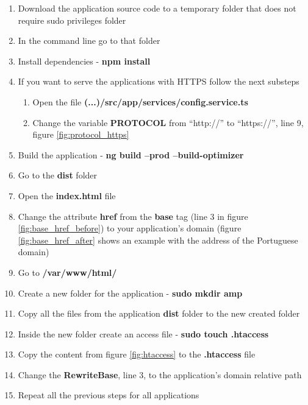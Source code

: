\begin{enumerate}
    \item Download the application source code to a temporary folder that does not require sudo privileges folder \item In the command line go to that folder
    \item Install dependencies - \textbf{npm install}
    \item If you want to serve the applications with HTTPS follow the next substeps
    \begin{enumerate}
        \item Open the file \textbf{(...)/src/app/services/config.service.ts}
        \item Change the variable \textbf{PROTOCOL} from ``http://'' to ``https://'', line 9, figure \ref{fig:protocol_https}
    \end{enumerate}
    \item Build the application - \textbf{ng build --prod --build-optimizer}
    \item Go to the \textbf{dist} folder
    \item Open the \textbf{index.html} file
    \item Change the attribute \textbf{href} from the \textbf{base} tag (line 3 in figure \ref{fig:base_href_before}) to your application's domain (figure \ref{fig:base_href_after} shows an example with the address of the Portuguese domain)
    \item Go to \textbf{/var/www/html/}
    \item Create a new folder for the application - \textbf{sudo mkdir amp}
    \item Copy all the files from the application \textbf{dist} folder to the new created folder
    \item Inside the new folder create an access file - \textbf{sudo touch .htaccess}
    \item Copy the content from figure \ref{fig:htaccess} to the \textbf{.htaccess} file
    \item Change the \textbf{RewriteBase}, line 3, to the application's domain relative path
    \item Repeat all the previous steps for all applications
\end{enumerate}


